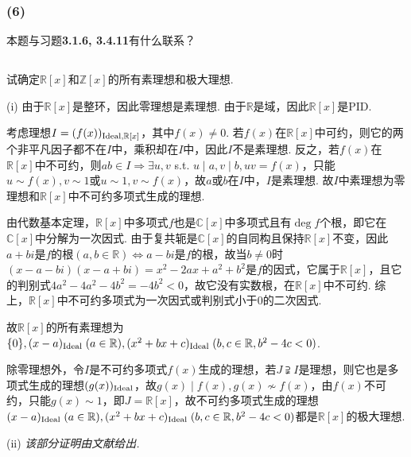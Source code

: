\subsubsection{(6)}
本题与{\heiti 习题}\textbf{3.1.6, 3.4.11}有什么联系？


\subsection{}
试确定$\mathbb{R}[x]$和$\mathbb{Z}[x]$的所有素理想和极大理想.

\jie (i) 由于$\mathbb{R}[x]$是整环，因此零理想是素理想. 由于$\mathbb{R}$是域，因此$\mathbb{R}[x]$是PID.

考虑理想$I=(f(x))_{\operatorname{Ideal}, \mathbb{R}[x]}$，其中$f(x)\neq 0$. 若$f(x)$在$\mathbb{R}[x]$中可约，则它的两个非平凡因子都不在$I$中，乘积却在$I$中，因此$I$不是素理想. 反之，若$f(x)$在$\mathbb{R}[x]$中不可约，则$ab\in I\Rightarrow \exists u,v$ s.t. $u\mid a,v\mid b, uv=f(x)$，只能$u\sim f(x),v\sim 1$或$u\sim1,v\sim f(x)$，故$a$或$b$在$I$中，$I$是素理想. 故$I$中素理想为零理想和$\mathbb{R}[x]$中不可约多项式生成的理想.

由代数基本定理，$\mathbb{R}[x]$中多项式$f$也是$\mathbb{C}[x]$中多项式且有$\deg f$个根，即它在$\mathbb{C}[x]$中分解为一次因式. 由于复共轭是$\mathbb{C}[x]$的自同构且保持$\mathbb{R}[x]$不变，因此$a+bi$是$f$的根$(a,b\in\mathbb{R})\Leftrightarrow a-bi$是$f$的根，故当$b\neq 0$时$(x-a-bi)(x-a+bi)=x^2-2ax+a^2+b^2$是$f$的因式，它属于$\mathbb{R}[x]$，且它的判别式$4a^2-4a^2-4b^2=-4b^2<0$，故它没有实数根，在$\mathbb{R}[x]$中不可约. 综上，$\mathbb{R}[x]$中不可约多项式为一次因式或判别式小于$0$的二次因式.

故$\mathbb{R}[x]$的所有素理想为$\{0\}, (x-a)_{\operatorname{Ideal}}\;(a\in\mathbb{R}), (x^2+bx+c)_{\operatorname{Ideal}}\;(b,c\in\mathbb{R}, b^2-4c<0)$.

除零理想外，令$I$是不可约多项式$f(x)$生成的理想，若$J\supsetneqq I$是理想，则它也是多项式生成的理想$(g(x))_{\operatorname{Ideal}}$，故$g(x)\mid f(x), g(x)\nsim f(x)$，由$f(x)$不可约，只能$g(x)\sim 1$，即$J=\mathbb{R}[x]$，故不可约多项式生成的理想$(x-a)_{\operatorname{Ideal}}\;(a\in\mathbb{R}), (x^2+bx+c)_{\operatorname{Ideal}}\;(b,c\in\mathbb{R}, b^2-4c<0)$都是$\mathbb{R}[x]$的极大理想.

(ii) \emph{该部分证明由文献}\cite{174713}\emph{给出.}

